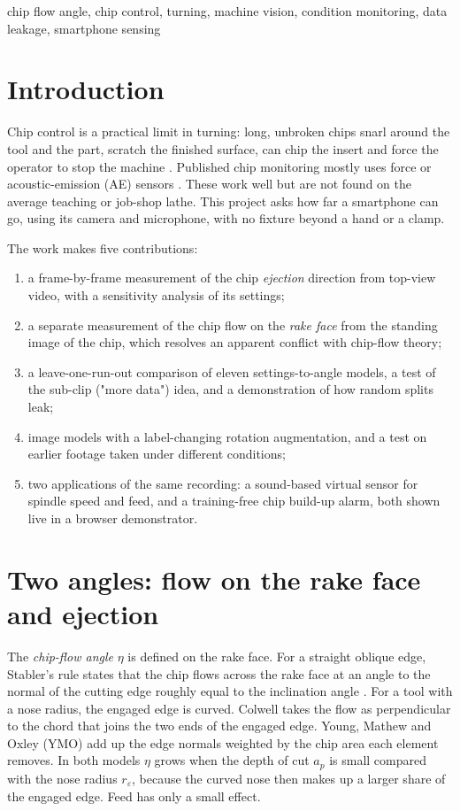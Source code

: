 \documentclass[conference,a4paper]{IEEEtran}
\begin{document}
\begin{IEEEkeywords}
chip flow angle, chip control, turning, machine vision, condition monitoring, data leakage, smartphone sensing
\end{IEEEkeywords}

\section{Introduction}
Chip control is a practical limit in turning: long, unbroken chips snarl around the tool and the part, scratch the finished surface, can chip the insert and force the operator to stop the machine \cite{jawahir1993}.
Published chip monitoring mostly uses force or acoustic-emission (AE) sensors \cite{dornfeld1985,sukvittayawong1991,kishawy2018}.
These work well but are not found on the average teaching or job-shop lathe.
This project asks how far a smartphone can go, using its camera and microphone, with no fixture beyond a hand or a clamp.

The work makes five contributions:
\begin{enumerate}
\item a frame-by-frame measurement of the chip \emph{ejection} direction from top-view video, with a sensitivity analysis of its settings;
\item a separate measurement of the chip flow on the \emph{rake face} from the standing image of the chip, which resolves an apparent conflict with chip-flow theory;
\item a leave-one-run-out comparison of eleven settings-to-angle models, a test of the sub-clip ("more data") idea, and a demonstration of how random splits leak;
\item image models with a label-changing rotation augmentation, and a test on earlier footage taken under different conditions;
\item two applications of the same recording: a sound-based virtual sensor for spindle speed and feed, and a training-free chip build-up alarm, both shown live in a browser demonstrator.
\end{enumerate}

\section{Two angles: flow on the rake face and ejection}\label{sec:angles}
The \emph{chip-flow angle} $\eta$ is defined on the rake face.
For a straight oblique edge, Stabler's rule states that the chip flows across the rake face at an angle to the normal of the cutting edge roughly equal to the inclination angle \cite{stabler1951}.
For a tool with a nose radius, the engaged edge is curved.
Colwell \cite{colwell1954} takes the flow as perpendicular to the chord that joins the two ends of the engaged edge.
Young, Mathew and Oxley (YMO) \cite{young1987} add up the edge normals weighted by the chip area each element removes.
In both models $\eta$ grows when the depth of cut $a_p$ is small compared with the nose radius $r_\varepsilon$, because the curved nose then makes up a larger share of the engaged edge.
Feed has only a small effect.
\end{document}
